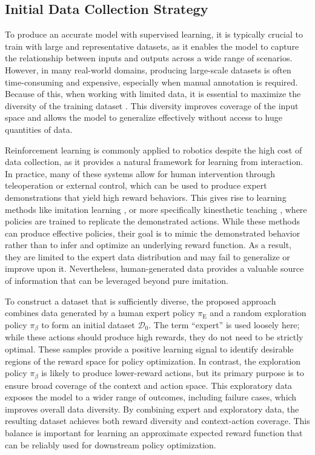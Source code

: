 \documentclass[./dissertation.tex]{subfiles}
\begin{document}
\subsection{Initial Data Collection Strategy}
To produce an accurate model with supervised learning, it is typically crucial to train with large and representative datasets, as it enables the model to capture the relationship between inputs and outputs across a wide range of scenarios. However, in many real-world domains, producing large-scale datasets is often time-consuming and expensive, especially when manual annotation is required. Because of this, when working with limited data, it is essential to maximize the diversity of the training dataset \parencite{Diversity}. This diversity improves coverage of the input space and allows the model to generalize effectively without access to huge quantities of data.

Reinforcement learning is commonly applied to robotics despite the high cost of data collection, as it provides a natural framework for learning from interaction. In practice, many of these systems allow for human intervention through teleoperation or external control, which can be used to produce expert demonstrations that yield high reward behaviors. This gives rise to learning methods like imitation learning \parencite{IL}, or more specifically kinesthetic teaching \parencite{KT}, where policies are trained to replicate the demonstrated actions. While these methods can produce effective policies, their goal is to mimic the demonstrated behavior rather than to infer and optimize an underlying reward function. As a result, they are limited to the expert data distribution and may fail to generalize or improve upon it. Nevertheless, human-generated data provides a valuable source of information that can be leveraged beyond pure imitation.

To construct a dataset that is sufficiently diverse, the proposed approach combines data generated by a human expert policy $\pi_{\text{E}}$ and a random exploration policy $\pi_{\beta}$ to form an initial dataset $\mathcal{D}_0$. The term ``expert'' is used loosely here; while these actions should produce high rewards, they do not need to be strictly optimal. These samples provide a positive learning signal to identify desirable regions of the reward space for policy optimization. In contrast, the exploration policy $\pi_\beta$ is likely to produce lower-reward actions, but its primary purpose is to ensure broad coverage of the context and action space. This exploratory data exposes the model to a wider range of outcomes, including failure cases, which improves overall data diversity. By combining expert and exploratory data, the resulting dataset achieves both reward diversity and context-action coverage. This balance is important for learning an approximate expected reward function that can be reliably used for downstream policy optimization.
\end{document}
